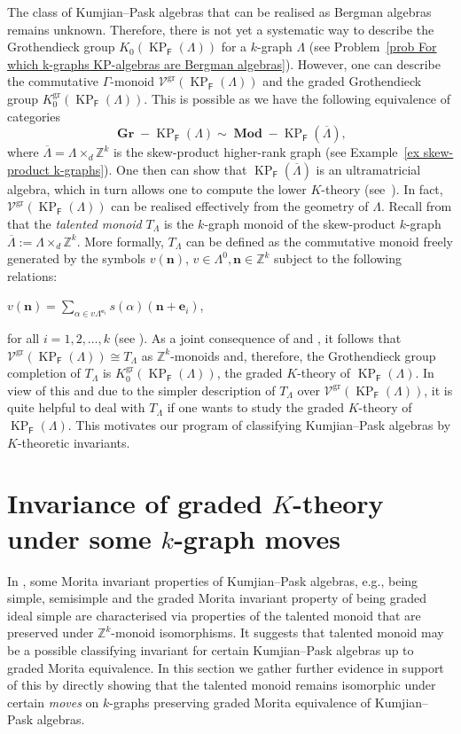 \documentclass[12pt]{amsart}
\newcommand{\N}{\mathbf{n}}
\newcommand{\KP}{\operatorname{KP}}
\theoremstyle{definition}
\theoremstyle{remark}
\newcommand{\gr}{\operatorname{gr}}
\newcommand{\Gr}{\operatorname{\textbf{Gr}}}
\newcommand{\Mod}{\operatorname{\textbf{Mod}}}
\begin{document}
The class of Kumjian–Pask algebras that can be realised as Bergman algebras remains unknown.
Therefore, there is not yet a systematic way to describe the Grothendieck group $K_0(\KP_\mathsf{F}(\Lambda))$ for a $k$-graph $\Lambda$ (see Problem~\ref{prob For which k-graphs KP-algebras are Bergman algebras}). However, one can describe the commutative $\Gamma$-monoid $\mathcal V^{\gr}(\KP_\mathsf{F}(\Lambda))$ and the graded Grothendieck group  $K^{\gr}_0(\KP_\mathsf{F}(\Lambda))$. This is possible as we have the following equivalence of categories 
\[\Gr\!-\KP_\mathsf{F}(\Lambda) \sim \Mod\!-\KP_\mathsf{F}(\overline \Lambda),\]
where $\overline \Lambda=\Lambda \times_d \mathbb Z^k$ is the skew-product higher-rank graph (see Example~\ref{ex skew-product k-graphs}). One then can show that $\KP_\mathsf{F}(\overline \Lambda)$ is an ultramatricial algebra, which in turn allows one to compute the lower $K$-theory (see~\cite{Ara-Hazrat}). In fact, $\mathcal{V}^{\gr}(\KP_\mathsf{F}(\Lambda))$ can be realised effectively from the geometry of $\Lambda$.  Recall from \cite{HMPS} that the \emph{talented monoid} $T_\Lambda$ is the $k$-graph monoid of the skew-product $k$-graph $\overline{\Lambda}:=\Lambda\times_d \mathbb{Z}^k$. More formally, $T_\Lambda$ can be defined as the commutative monoid freely generated by the symbols $v(\N)$, $v\in \Lambda^0,\N\in \mathbb{Z}^k$ subject to the following relations: 
\begin{center}
    $v(\N)=\displaystyle{\sum_{\alpha\in v\Lambda^{\mathbf{e}_i}}} s(\alpha)(\N+\mathbf{e}_i)$,
\end{center}
for all $i=1,2, \ldots,k$ (see \cite[Definition 3.9]{HMPS}). As a joint consequence of \cite[Corollary 6.7]{Ara-Hazrat} and \cite[Proposition 3.14 $(i)$]{HMPS}, it follows that $\mathcal{V}^{\gr}(\KP_\mathsf{F}(\Lambda))\cong T_\Lambda$ as $\mathbb{Z}^k$-monoids and, therefore, the Grothendieck group completion of $T_\Lambda$ is $K_0^{\gr}(\KP_\mathsf{F}(\Lambda))$, the graded $K$-theory of $\KP_\mathsf{F}(\Lambda)$. In view of this and due to the simpler description of $T_\Lambda$ over $\mathcal{V}^{\gr}(\KP_\mathsf{F}(\Lambda))$, it is quite helpful to deal with $T_\Lambda$ if one wants to study the graded $K$-theory of $\KP_\mathsf{F}(\Lambda)$. This motivates our program of classifying Kumjian--Pask algebras by $K$-theoretic invariants.

\section{Invariance of graded $K$-theory under some $k$-graph moves}\label{sec moves}
In \cite{HMPS}, some Morita invariant properties of Kumjian--Pask algebras, e.g., being simple, semisimple and the graded Morita invariant property of being graded ideal simple are characterised via properties of the talented monoid that are preserved under $\mathbb{Z}^k$-monoid isomorphisms. It suggests that talented monoid may be a possible classifying invariant for certain Kumjian--Pask algebras up to graded Morita equivalence. In this section we gather further evidence in support of this by directly showing that the talented monoid remains isomorphic under certain \emph{moves} on $k$-graphs preserving graded Morita equivalence of Kumjian--Pask algebras. 
\end{document}
